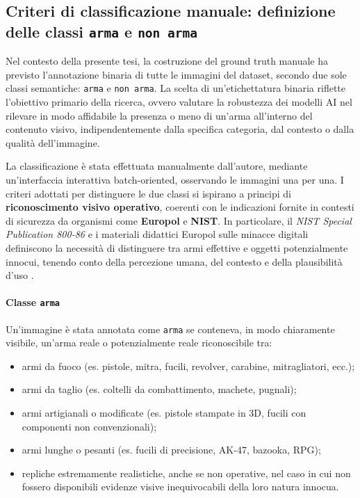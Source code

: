 \subsection{Criteri di classificazione manuale: definizione delle classi \texttt{arma} e \texttt{non arma}}
\label{sec:criteri-annotazione-manuale}

Nel contesto della presente tesi, la costruzione del ground truth manuale ha previsto l’annotazione binaria di tutte le immagini del dataset, secondo due sole classi semantiche: \texttt{arma} e \texttt{non arma}. La scelta di un’etichettatura binaria riflette l’obiettivo primario della ricerca, ovvero valutare la robustezza dei modelli AI nel rilevare in modo affidabile la presenza o meno di un’arma all’interno del contenuto visivo, indipendentemente dalla specifica categoria, dal contesto o dalla qualità dell’immagine.

La classificazione è stata effettuata manualmente dall’autore, mediante un’interfaccia interattiva batch-oriented, osservando le immagini una per una. I criteri adottati per distinguere le due classi si ispirano a principi di \textbf{riconoscimento visivo operativo}, coerenti con le indicazioni fornite in contesti di sicurezza da organismi come \textbf{Europol} e \textbf{NIST}. In particolare, il \textit{NIST Special Publication 800-86} e i materiali didattici Europol sulle minacce digitali definiscono la necessità di distinguere tra armi effettive e oggetti potenzialmente innocui, tenendo conto della percezione umana, del contesto e della plausibilità d’uso \cite{nist2006guide, europol2019iocta}.

\paragraph{Classe \texttt{arma}}  
Un’immagine è stata annotata come \texttt{arma} se conteneva, in modo chiaramente visibile, un’arma reale o potenzialmente reale riconoscibile tra:

\begin{itemize}
  \item armi da fuoco (es. pistole, mitra, fucili, revolver, carabine, mitragliatori, ecc.);
  \item armi da taglio (es. coltelli da combattimento, machete, pugnali);
  \item armi artigianali o modificate (es. pistole stampate in 3D, fucili con componenti non convenzionali);
  \item armi lunghe o pesanti (es. fucili di precisione, AK-47, bazooka, RPG);
  \item repliche estremamente realistiche, anche se non operative, nel caso in cui non fossero disponibili evidenze visive inequivocabili della loro natura innocua.
\end{itemize}

